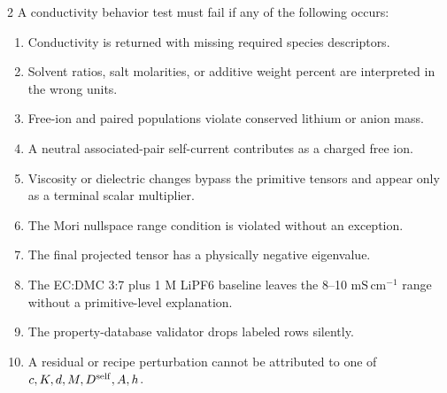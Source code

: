 \documentclass[10pt]{article}
\newcommand{\mScm}{\mathrm{mS\,cm^{-1}}}
\begin{document}
\begin{multicols}{2}
A conductivity behavior test must fail if any of the following occurs:
\begin{enumerate}
\item Conductivity is returned with missing required species descriptors.
\item Solvent ratios, salt molarities, or additive weight percent are interpreted
in the wrong units.
\item Free-ion and paired populations violate conserved lithium or anion mass.
\item A neutral associated-pair self-current contributes as a charged free ion.
\item Viscosity or dielectric changes bypass the primitive tensors and appear
only as a terminal scalar multiplier.
\item The Mori nullspace range condition is violated without an exception.
\item The final projected tensor has a physically negative eigenvalue.
\item The EC:DMC 3:7 plus 1 M LiPF6 baseline leaves the 8--10 \(\mScm\) range
without a primitive-level explanation.
\item The property-database validator drops labeled rows silently.
\item A residual or recipe perturbation cannot be attributed to one of
\(c,K,d,M,D^{\rm self},A,h\).
\end{enumerate}

\end{multicols}
\end{document}
